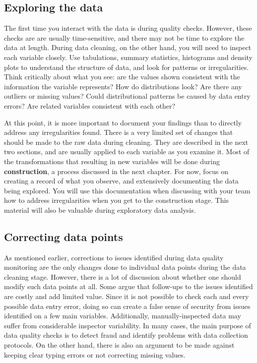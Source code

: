 \subsection{Exploring the data}

The first time you interact with the data is during quality checks.
However, these checks are are usually time-sensitive, 
and there may not be time to explore the data at length.
During data cleaning, on the other hand, 
you will need to inspect each variable closely.
Use tabulations, summary statistics, histograms and density plots to understand the structure of data,
and look for patterns or irregularities.
Think critically about what you see:
are the values shown consistent with the information the variable represents?
How do distributions look? 
Are there any outliers or missing values?
Could distributional patterns be caused by data entry errors?
Are related variables consistent with each other?

At this point, it is more important to document your findings
than to directly address any irregularities found.
There is a very limited set of changes that should be made to the raw data during cleaning.
They are described in the next two sections,
and are usually applied to each variable as you examine it.
Most of the transformations that resulting in new variables
will be done during \textbf{construction}, a process discussed in the next chapter.
For now, focus on creating a record of what you observe,
and extensively documenting the data being explored.
You will use this documentation when discussing with your team
how to address irregularities when you get to the construction stage.
This material will also be valuable during exploratory data analysis.

\subsection{Correcting data points}

As mentioned earlier, 
corrections to issues identified during data quality monitoring are
the only changes done to individual data points during the data cleaning stage.
However, there is a lot of discussion about whether one should modify such data points at all.
Some argue that follow-ups to the issues identified are costly and add limited value.
Since it is not possible to check each and every possible data entry error,
doing so can create a false sense of security from issues identified on a few main variables. 
Additionally, manually-inspected data may suffer from considerable inspector variability.
In many cases, the main purpose of data quality checks 
is to detect fraud and identify problems with data collection protocols. 
On the other hand, there is also an argument to be made
against keeping clear typing errors or not correcting missing values.


